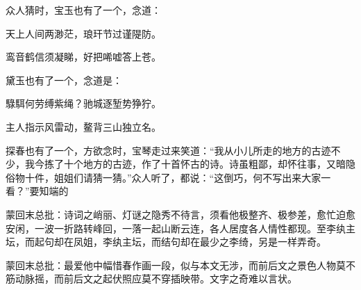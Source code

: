 \begin{parag}
    众人猜时，宝玉也有了一个，念道：
\end{parag}
\begin{poem}

    \begin{pl}

        天上人间两渺茫，琅玕节过谨隄防。
    \end{pl}
    \begin{pl}

        鸾音鹤信须凝睇，好把唏嘘答上苍。
    \end{pl}

\end{poem}
\begin{parag}
    黛玉也有了一个，念道是：
\end{parag}


\begin{poem}
    \begin{pl}

        騄駬何劳缚紫绳？驰城逐堑势狰狞。
    \end{pl}
    \begin{pl}

        主人指示风雷动，鳌背三山独立名。
    \end{pl}

\end{poem}
\begin{parag}
    探春也有了一个，方欲念时，宝琴走过来笑道：“我从小儿所走的地方的古迹不少，我今拣了十个地方的古迹，作了十首怀古的诗。诗虽粗鄙，却怀往事，又暗隐俗物十件，姐姐们请猜一猜。”众人听了，都说：“这倒巧，何不写出来大家一看？”要知端的
\end{parag}


\begin{parag}
    \begin{note}蒙回末总批：诗词之峭丽、灯谜之隐秀不待言，须看他极整齐、极参差，愈忙迫愈安闲，一波一折路转峰回，一落一起山断云连，各人居度各人情性都现。至李纨主坛，而起句却在凤姐，李纨主坛，而结句却在最少之李绮，另是一样弄奇。\end{note}
\end{parag}


\begin{parag}
    \begin{note}蒙回末总批：最爱他中幅惜春作画一段，似与本文无涉，而前后文之景色人物莫不筋动脉摇，而前后文之起伏照应莫不穿插映带。文字之奇难以言状。\end{note}
\end{parag}


